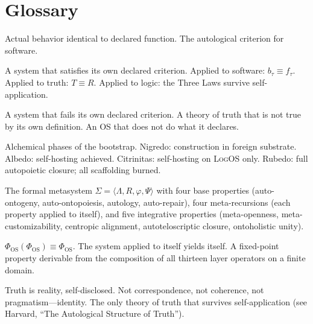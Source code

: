 \documentclass[11pt, oneside]{article}
\newcommand{\LogOS}{\textnormal{\textsc{LogOS}}}
\newcommand{\Logos}{\Lambda}
\begin{document}
\section*{Glossary}

\begin{description}[leftmargin=1.4em, labelindent=0pt, itemsep=3pt,
                    parsep=0pt, font=\normalfont\bfseries]

\item[$b_\tau \equiv f_\tau$ (Tautology of Tools)]
Actual behavior identical to declared function. The autological
criterion for software.

\item[Autological]
A system that satisfies its own declared criterion. Applied to software:
$b_\tau \equiv f_\tau$. Applied to truth: $T \equiv R$. Applied to
logic: the Three Laws survive self-application.

\item[Heterological]
A system that fails its own declared criterion. A theory of truth that
is not true by its own definition. An OS that does not do what it
declares.

\item[Nigredo / Albedo / Citrinitas / Rubedo]
Alchemical phases of the bootstrap. Nigredo: construction in foreign
substrate. Albedo: self-hosting achieved. Citrinitas: self-hosting on
\LogOS{} only. Rubedo: full autopoietic closure; all scaffolding
burned.

\item[Thirteen Properties]
The formal metasystem $\Sigma = \langle \Logos, R, \varphi, \Psi
\rangle$ with four base properties (auto-ontogeny, auto-ontopoiesis,
autology, auto-repair), four meta-recursions (each property applied to
itself), and five integrative properties (meta-openness,
meta-customizability, centropic alignment, autoteloscriptic closure,
ontoholistic unity).

\item[Metacursive Closure]
$\Phi_{\mathrm{OS}}(\Phi_{\mathrm{OS}}) \equiv \Phi_{\mathrm{OS}}$. The
system applied to itself yields itself. A fixed-point property derivable
from the composition of all thirteen layer operators on a finite domain.

\item[$T \equiv R$ (Identity Theory of Truth)]
Truth is reality, self-disclosed. Not correspondence, not coherence, not
pragmatism---identity. The only theory of truth that survives
self-application (see Harvard, ``The Autological Structure of Truth'').


\end{description}
\end{document}
